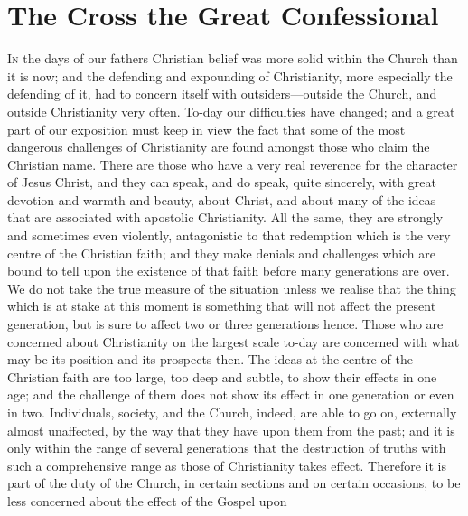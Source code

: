 \documentclass[12pt,a5paper,twoside,titlepage]{book}
\begin{document}
\chapter{The Cross the Great Confessional} 



\textsc{In} the days of our fathers Christian belief 
was more solid within the Church than it 
is now; and the defending and expounding of 
Christianity, more especially the defending of 
it, had to concern itself with outsiders---outside 
the Church, and outside Christianity very often. 
To-day our difficulties have changed; and a 
great part of our exposition must keep in view 
the fact that some of the most dangerous challenges 
of Christianity are found amongst those 
who claim the Christian name. There are those 
who have a very real reverence for the character 
of Jesus Christ, and they can speak, and 
do speak, quite sincerely, with great devotion 
and warmth and beauty, about Christ, and 
about many of the ideas that are associated 
with apostolic Christianity. All the same, they 
are strongly and sometimes even violently, 
antagonistic to that redemption which is the 
very centre of the Christian faith; and they 
make denials and challenges which are bound 
to tell upon the existence of that faith before 
many generations are over. We do not take 
the true measure of the situation unless we 
realise that the thing which is at stake at this 
moment is something that will not affect the 
present generation, but is sure to affect two or 
three generations hence. Those who are concerned 
about Christianity on the largest scale 
to-day are concerned with what may be its 
position and its prospects then. The ideas at 
the centre of the Christian faith are too large, 
too deep and subtle, to show their effects 
in one age; and the challenge of them does 
not show its effect in one generation or even 
in two. Individuals, society, and the Church, 
indeed, are able to go on, externally almost unaffected, 
by the way that they have upon them 
from the past; and it is only within the range 
of several generations that the destruction of 
truths with such a comprehensive range as 
those of Christianity takes effect. Therefore it 
is part of the duty of the Church, in certain 
sections and on certain occasions, to be less 
concerned about the effect of the Gospel upon 
\end{document}
